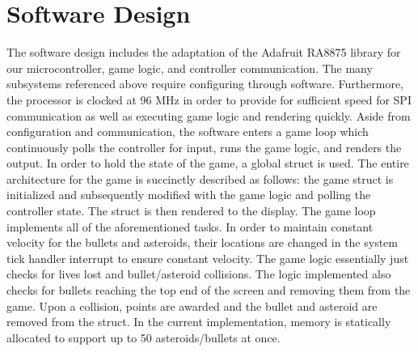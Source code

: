\documentclass[a4paper, 12pt]{article}
\begin{document}
\section*{Software Design}
The software design includes the adaptation of the Adafruit RA8875 library for our microcontroller, game logic, and controller communication. The many subsystems referenced above require configuring through software. Furthermore, the processor is clocked at 96 MHz in order to provide for sufficient speed for SPI communication as well as executing game logic and rendering quickly. Aside from configuration and communication, the software enters a game loop which continuously polls the controller for input, runs the game logic, and renders the output. In order to hold the state of the game, a global  struct is used. The entire architecture for the game is succinctly described as follows: the game struct is initialized and subsequently modified with the game logic and polling the controller state. The struct is then rendered to the display. The game loop implements all of the aforementioned tasks. In order to maintain constant velocity for the bullets and asteroids, their locations are changed in the system tick handler interrupt to ensure constant velocity.
The game logic essentially just checks for lives lost and bullet/asteroid collisions. The logic implemented also checks for bullets reaching the top end of the screen and removing them from the game. Upon a collision, points are awarded and the bullet and asteroid are removed from the struct. In the current implementation, memory is statically allocated to support up to 50 asteroids/bullets at once. 

\clearpage
\end{document}
